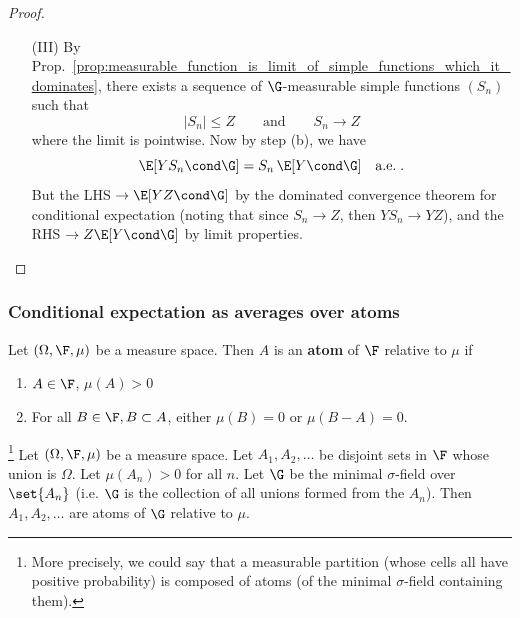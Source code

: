 \documentclass{article} %
\begin{document}
\begin{proof}
\begin{itemize}
\begin{itemize}
\begin{itemize}
%
\item[(III)]   By Prop.~\ref{prop:measurable_function_is_limit_of_simple_functions_which_it_dominates},  there exists a sequence of $\G$-measurable simple functions $(S_n)$ such that 
\[  |S_n| \leq Z \quad \quad \text{and} \quad \quad S_n \to Z \]
where the limit is pointwise.  Now by step (b), we have 
\[  \E[Y S_n \cond \G] = S_n \, \E[Y \cond \G] \quad \text{a.e.} \; .\]
But the LHS $\to \E[Y Z \cond \G]$ by the dominated convergence theorem for conditional expectation \cite[Thm.~5.5.5]{ash2000probability} (noting that since $S_n \to Z$, then $Y S_n \to YZ$), and the RHS $\to Z  \E[Y \cond \G] $ by limit properties.
\end{itemize}
\end{itemize}		
\end{itemize}
\end{proof}

\subsubsection{Conditional expectation as averages over atoms}

\begin{definition}
Let $(\Omega, \F, 
\mu)$ be a measure space.  Then $A$ is an \textbf{atom} of $\F$ relative to $\mu$ if
\begin{enumerate}
	\item $A \in \F$, $\mu(A) > 0$
	\item For all $B \in \F, B \subset A$, either $\mu(B)=0$ or $\mu(B-A)=0$.
\end{enumerate} 
\label{def:atoms}
\end{definition}


\begin{example}\footnote{More precisely, we could say that a measurable partition (whose cells all have positive probability) is composed of atoms (of the minimal $\sigma$-field containing them).}    Let $(\Omega, \F, 
\mu)$ be a measure space. Let $A_1, A_2, \hdots$ be disjoint sets in $\F$ whose union is $\Omega$.  Let $\mu(A_n) >0$ for all $n$.  Let $\G$ be the minimal $\sigma$-field over $\set{A_n}$ (i.e. $\G$ is the collection of all unions formed from the $A_n$).  Then $A_1, A_2, \hdots$ are atoms of $\G$ relative to $\mu$.
\label{ex:measurable_partition_has_cells_which_are_atoms}
\end{example}
	
\end{document}
